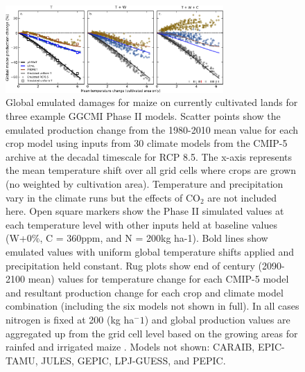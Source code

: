 \begin{figure}[ht]
    \centering
    \includegraphics[width = 8.3cm]{figures/global_em_maize.png}
    \caption{Global emulated damages for maize on currently cultivated lands for three example GGCMI Phase II models. 
    Scatter points show the emulated production change from the 1980-2010 mean value for each crop model using inputs from 30 climate models from the CMIP-5 archive \citep{Taylor2012} at the decadal timescale for RCP 8.5.
    The x-axis represents the mean temperature shift over all grid cells where crops are grown (no weighted by cultivation area).
    Temperature and precipitation vary in the climate runs but the effects of CO$_2$ are not included here.
    Open square markers show the Phase II simulated values at each temperature level with other inputs held at baseline values (W+0\%, C = 360ppm, and N = 200kg ha-1).
    Bold lines show emulated values with uniform global temperature shifts applied and precipitation held constant. 
    Rug plots show end of century (2090-2100 mean) values for temperature change for each CMIP-5 model and resultant production change for each crop and climate model combination (including the six models not shown in full).
    In all cases nitrogen is fixed at 200 (kg ha$^-1$) and global production values are aggregated up from the grid cell level based on the growing areas for rainfed and irrigated maize \citep{Portmann2010}. 
    Models not shown: CARAIB, EPIC-TAMU, JULES, GEPIC, LPJ-GUESS, and PEPIC.
    }
    \label{fig

}
\end{figure}
